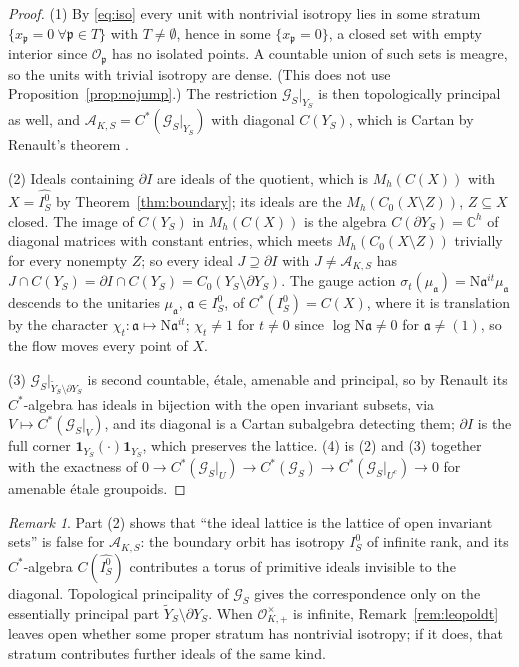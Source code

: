 \documentclass[11pt]{amsart}
\numberwithin{equation}{section}
\theoremstyle{definition}
\theoremstyle{remark}
\newtheorem{remark}[theorem]{Remark}
\newcommand{\C}{\mathbb{C}}
\newcommand{\cA}{\mathcal{A}}
\newcommand{\cG}{\mathcal{G}}
\newcommand{\cO}{\mathcal{O}}
\newcommand{\pp}{\mathfrak{p}}
\newcommand{\aaa}{\mathfrak{a}}
\newcommand{\Ns}{\mathrm{N}}
\begin{document}
\begin{proof}
(1) By \eqref{eq:iso} every unit with nontrivial isotropy lies in some stratum
$\{x_\pp=0\ \forall\pp\in T\}$ with $T\ne\emptyset$, hence in some $\{x_\pp=0\}$, a closed set
with empty interior since $\cO_\pp$ has no isolated points. A countable union of such sets
is meagre, so the units with trivial isotropy are dense. (This does not use
Proposition~\ref{prop:nojump}.) The restriction $\cG_S|_{Y_S}$ is then topologically
principal as well, and $\cA_{K,S}=C^*(\cG_S|_{Y_S})$ with diagonal $C(Y_S)$, which is Cartan
by Renault's theorem \cite{Renault08}.

(2) Ideals containing $\partial I$ are ideals of the quotient, which is $M_h(C(X))$ with
$X=\widehat{I_S^0}$ by Theorem~\ref{thm:boundary}; its ideals are the $M_h(C_0(X\setminus Z))$,
$Z\subseteq X$ closed. The image of $C(Y_S)$ in $M_h(C(X))$ is the algebra
$C(\partial Y_S)=\C^h$ of diagonal matrices with constant entries, which meets
$M_h(C_0(X\setminus Z))$ trivially for every nonempty $Z$; so every ideal $J\supseteq\partial I$
with $J\ne\cA_{K,S}$ has $J\cap C(Y_S)=\partial I\cap C(Y_S)=C_0(Y_S\setminus\partial Y_S)$.
The gauge action $\sigma_t(\mu_\aaa)=\Ns\aaa^{it}\mu_\aaa$ descends to the unitaries
$\mu_\aaa$, $\aaa\in I_S^0$, of $C^*(I_S^0)=C(X)$, where it is translation by the character
$\chi_t:\aaa\mapsto\Ns\aaa^{it}$; $\chi_t\ne1$ for $t\ne0$ since $\log\Ns\aaa\ne0$ for
$\aaa\ne(1)$, so the flow moves every point of $X$.

(3) $\cG_S|_{\widetilde Y_S\setminus\partial Y_S}$ is second countable, \'etale, amenable and
principal, so by Renault \cite{Renault} its $C^*$-algebra has ideals in bijection with the
open invariant subsets, via $V\mapsto C^*(\cG_S|_V)$, and its diagonal is a Cartan
subalgebra detecting them; $\partial I$ is the full corner $\mathbf 1_{Y_S}(\cdot)\mathbf 1_{Y_S}$,
which preserves the lattice. (4) is (2) and (3) together with the exactness of
$0\to C^*(\cG_S|_U)\to C^*(\cG_S)\to C^*(\cG_S|_{U^c})\to0$ for amenable \'etale groupoids.
\end{proof}

\begin{remark}\label{rem:lattice}
Part (2) shows that ``the ideal lattice is the lattice of open invariant sets'' is false
for $\cA_{K,S}$: the boundary orbit has isotropy $I_S^0$ of infinite rank, and its
$C^*$-algebra $C(\widehat{I_S^0})$ contributes a torus of primitive ideals invisible to the
diagonal. Topological principality of $\cG_S$ gives the correspondence only on the
essentially principal part $\widetilde Y_S\setminus\partial Y_S$. When $\cO^\times_{K,+}$ is
infinite, Remark~\ref{rem:leopoldt} leaves open whether some proper stratum has nontrivial
isotropy; if it does, that stratum contributes further ideals of the same kind.
\end{remark}
\end{document}
